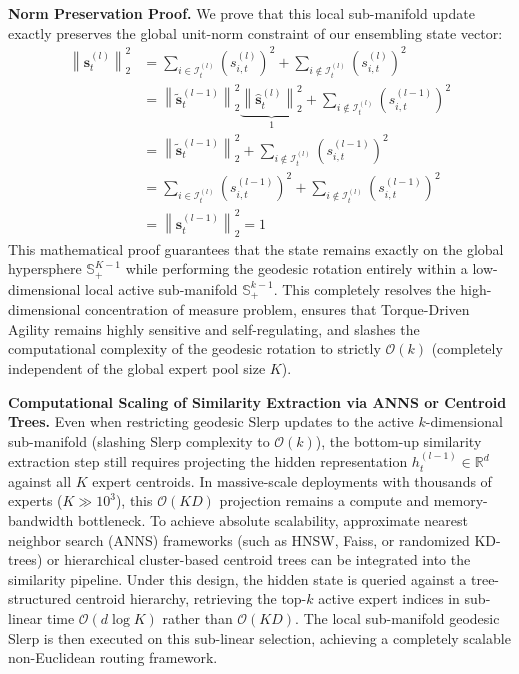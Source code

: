 \documentclass{article}
\theoremstyle{plain}
\theoremstyle{definition}
\theoremstyle{remark}
\begin{document}
\textbf{Norm Preservation Proof.}
We prove that this local sub-manifold update exactly preserves the global unit-norm constraint of our ensembling state vector:
\begin{align}
\left\|\mathbf{s}_t^{(l)}\right\|_2^2 &= \sum_{i \in \mathcal{I}_t^{(l)}} \left(s_{i, t}^{(l)}\right)^2 + \sum_{i \notin \mathcal{I}_t^{(l)}} \left(s_{i, t}^{(l)}\right)^2 \nonumber \\
&= \left\|\tilde{\mathbf{s}}_t^{(l-1)}\right\|_2^2 \underbrace{\left\|\hat{\mathbf{s}}_t^{(l)}\right\|_2^2}_{1} + \sum_{i \notin \mathcal{I}_t^{(l)}} \left(s_{i, t}^{(l-1)}\right)^2 \nonumber \\
&= \left\|\tilde{\mathbf{s}}_t^{(l-1)}\right\|_2^2 + \sum_{i \notin \mathcal{I}{_t^{(l)}}} \left(s_{i, t}^{(l-1)}\right)^2 \nonumber \\
&= \sum_{i \in \mathcal{I}_t^{(l)}} \left(s_{i, t}^{(l-1)}\right)^2 + \sum_{i \notin \mathcal{I}_t^{(l)}} \left(s_{i, t}^{(l-1)}\right)^2 \nonumber \\
&= \left\|\mathbf{s}_t^{(l-1)}\right\|_2^2 = 1
\end{align}
This mathematical proof guarantees that the state remains exactly on the global hypersphere $\mathbb{S}^{K-1}_+$ while performing the geodesic rotation entirely within a low-dimensional local active sub-manifold $\mathbb{S}^{k-1}_+$. This completely resolves the high-dimensional concentration of measure problem, ensures that Torque-Driven Agility remains highly sensitive and self-regulating, and slashes the computational complexity of the geodesic rotation to strictly $\mathcal{O}(k)$ (completely independent of the global expert pool size $K$).

\textbf{Computational Scaling of Similarity Extraction via ANNS or Centroid Trees.} Even when restricting geodesic Slerp updates to the active $k$-dimensional sub-manifold (slashing Slerp complexity to $\mathcal{O}(k)$), the bottom-up similarity extraction step still requires projecting the hidden representation $h_t^{(l-1)} \in \mathbb{R}^d$ against all $K$ expert centroids. In massive-scale deployments with thousands of experts ($K \gg 10^3$), this $\mathcal{O}(KD)$ projection remains a compute and memory-bandwidth bottleneck. To achieve absolute scalability, approximate nearest neighbor search (ANNS) frameworks (such as HNSW, Faiss, or randomized KD-trees) or hierarchical cluster-based centroid trees can be integrated into the similarity pipeline. Under this design, the hidden state is queried against a tree-structured centroid hierarchy, retrieving the top-$k$ active expert indices in sub-linear time $\mathcal{O}(d \log K)$ rather than $\mathcal{O}(KD)$. The local sub-manifold geodesic Slerp is then executed on this sub-linear selection, achieving a completely scalable non-Euclidean routing framework.
\end{document}
